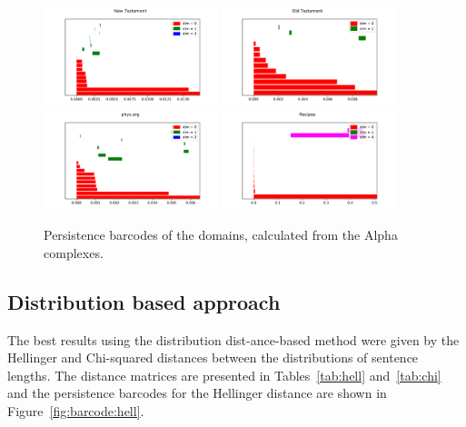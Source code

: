 \documentclass[12pt,a4paper]{amsart}
\begin{document}
\begin{figure}
  \centering
  \includegraphics[width=0.45\textwidth]{../plots/barcodes/bible-new-alpha}
  \includegraphics[width=0.45\textwidth]{../plots/barcodes/bible-old-alpha}
  \includegraphics[width=0.45\textwidth]{../plots/barcodes/phys-alpha}
  \includegraphics[width=0.45\textwidth]{../plots/barcodes/recipes-alpha}
  \caption{Persistence barcodes of the domains, calculated from the Alpha
    complexes.}
  \label{fig:barcode:alpha}
\end{figure}

\subsection{Distribution based approach}

The best results using the distribution dist-ance-based method were given by the
Hellinger and Chi-squared distances between the distributions of sentence
lengths. The distance matrices are presented in Tables~\ref{tab:hell}
and~\ref{tab:chi} and the persistence barcodes for the Hellinger distance are
shown in Figure~\ref{fig:barcode:hell}.
\end{document}
